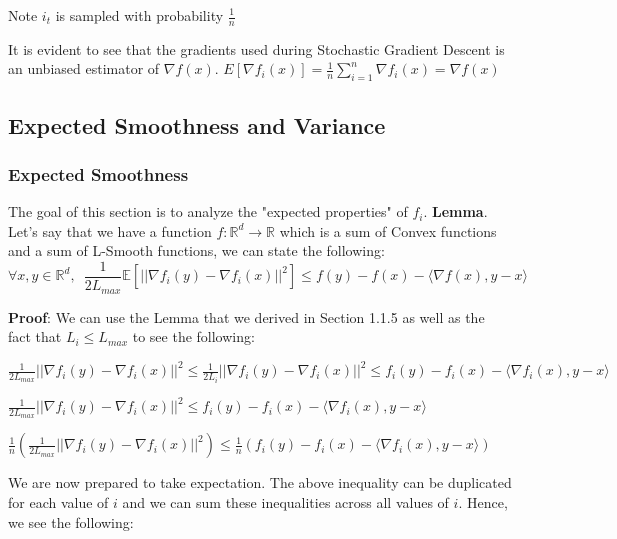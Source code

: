 \noindent Note $i_t$ is sampled with probability $\frac{1}{n}$

\noindent It is evident to see that the gradients used during Stochastic Gradient Descent is an unbiased estimator of $\nabla f(x)$. $E[\nabla f_i(x)] = \frac{1}{n} \sum_{i=1}^{n} \nabla f_i(x) = \nabla f(x)$

\subsection{Expected Smoothness and Variance}
\subsubsection{Expected Smoothness}
The goal of this section is to analyze the "expected properties" of $f_i$. \newline 
\noindent \textbf{Lemma}. Let's say that we have a function $f: \mathbb{R}^d \rightarrow \mathbb{R}$ which is a sum of Convex functions and a sum of L-Smooth functions, we can state the following: 
\begin{equation}
    \forall x, y \in \mathbb{R}^d, \enspace \frac{1}{2L_{max}} \mathbb{E}[||\nabla f_i(y) - \nabla f_i(x)||^2] \leq f(y) - f(x) - \langle \nabla f(x), y - x \rangle
\end{equation}

\noindent \textbf{Proof}: 
We can use the Lemma that we derived in Section 1.1.5 as well as the fact that $L_i \leq L_{max}$ to see the following: \newline 

$\frac{1}{2L_{max}} ||\nabla f_i(y) - \nabla f_i(x)||^2 \leq \frac{1}{2L_i} ||\nabla f_i(y) - \nabla f_i(x)||^2 \leq f_i(y) - f_i(x) - \langle \nabla f_i(x), y - x \rangle$ \newline 

$\frac{1}{2L_{max}} ||\nabla f_i(y) - \nabla f_i(x)||^2 \leq f_i(y) - f_i(x) - \langle \nabla f_i(x), y - x \rangle$ \newline 

$\frac{1}{n} (\frac{1}{2L_{max}} ||\nabla f_i(y) - \nabla f_i(x)||^2) \leq \frac{1}{n} (f_i(y) - f_i(x) - \langle \nabla f_i(x), y - x \rangle)$ \newline 

We are now prepared to take expectation. The above inequality can be duplicated for each value of $i$ and we can sum these inequalities across all values of $i$. Hence, we see the following: \newline 

